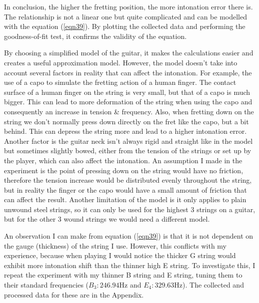 In conclusion, the higher the fretting position, the more intonation error there is. The relationship is not a linear one but quite complicated and can be modelled with the equation (\ref{eqn39}). By plotting the collected data and performing the goodness-of-fit test, it confirms the validity of the equation. \par
By choosing a simplified model of the guitar, it makes the calculations easier and creates a useful approximation model. However, the model doesn't take into account several factors in reality that can affect the intonation. For example, the use of a capo to simulate the fretting action of a human finger. The contact surface of a human finger on the string is very small, but that of a capo is much bigger. This can lead to more deformation of the string when using the capo and consequently an increase in tension \& frequency. Also, when fretting down on the string we don't normally press down directly on the fret like the capo, but a bit behind. This can depress the string more and lead to a higher intonation error. Another factor is the guitar neck isn't always rigid and straight like in the model but sometimes slightly bowed, either from the tension of the strings or set up by the player, which can also affect the intonation. An assumption I made in the experiment is the point of pressing down on the string would have no friction, therefore the tension increase would be distributed evenly throughout the string, but in reality the finger or the capo would have a small amount of friction that can affect the result. Another limitation of the model is it only applies to plain unwound steel strings, so it can only be used for the highest 3 strings on a guitar, but for the other 3 wound strings we would need a different model.\par

An observation I can make from equation (\ref{eqn39}) is that it is not dependent on the gauge (thickness) of the string I use. However, this conflicts with my experience, because when playing I would notice the thicker G string would exhibit more intonation shift than the thinner high E string. To investigate this, I repeat the experiment with my thinner B string and E string, tuning them to their standard frequencies ($B_3: 246.94$Hz and $E_4: 329.63$Hz). The collected and processed data for these are in the Appendix.

